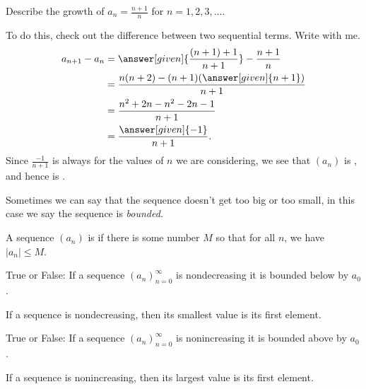 \documentclass{ximera}
\begin{document}
\begin{example}
  Describe the growth of $a_n = \frac{n+1}{n}$ for $n=1,2,3,\dots$.
  \begin{explanation}
    To do this, check out the difference between two sequential terms.
    Write with me.
    \begin{align*}
    a_{n+1} - a_n &= \answer[given]{\frac{(n+1)+1}{n+1}} - \frac{n+1}{n}\\
    &=\frac{n(n+2) - (n+1)(\answer[given]{n+1})}{n+1}\\
    &=\frac{n^2+2n - n^2 -2n-1}{n+1}\\
    &=\frac{\answer[given]{-1}}{n+1}.
    \end{align*}
    Since $\frac{-1}{n+1}$ is always
     for the values of $n$ we are considering,
    we see that $(a_n)$ is
    , and hence is .
  \end{explanation}
\end{example}

Sometimes we can say that the sequence doesn't get too big or too
small, in this case we say the sequence is \textit{bounded}.

\begin{definition}
  \label{definition:sequence-bounded}
  A sequence $(a_n)$ is  if there is some number $M$ so
  that for all $n$, we have $|a_n|\le M$.
\end{definition}

\begin{question}
  True or False: If a sequence $(a_n)_{n=0}^\infty$ is nondecreasing
  it is bounded below by $a_0$.
  \begin{prompt}
    \begin{multipleChoice}
    \end{multipleChoice}
  \end{prompt}
  \begin{feedback}
    If a sequence is nondecreasing, then its smallest value is its
    first element.
  \end{feedback}
\end{question}


\begin{question}
  True or False: If a sequence $(a_n)_{n=0}^\infty$ is nonincreasing
  it is bounded above by $a_0$.
  \begin{prompt}
    \begin{multipleChoice}
    \end{multipleChoice}
  \end{prompt}
  \begin{feedback}
    If a sequence is nonincreasing, then its largest value is its
    first element.
  \end{feedback}
\end{question}
\end{document}
